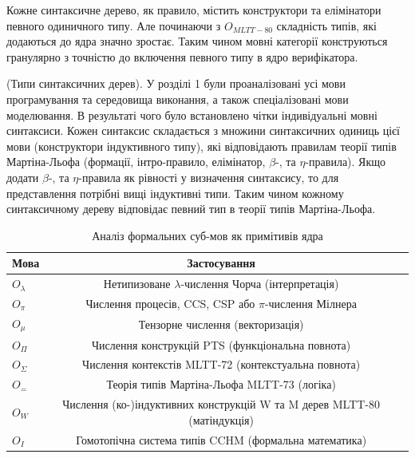 Кожне синтаксичне дерево, як правило, містить конструктори
та елімінатори певного одиничного типу. Але починаючи з $O_{MLTT-80}$
складність типів, які додаються до ядра значно зростає.
Таким чином мовні категорії конструються гранулярно з
точністю до включення певного типу в ядро верифікатора.

\begin{definition} (Типи синтаксичних дерев).
У розділі 1 були проаналізовані усі мови програмування та середовища виконання,
а також спеціалізовані мови моделювання. В результаті чого було встановлено
чітки індивідуальні мовні синтаксиси. Кожен синтаксис складається з
множини синтаксичних одиниць цієї мови (конструктори індуктивного типу),
які відповідають правилам теорії типів Мартіна-Льофа (формації, інтро-правило,
елімінатор, $\beta$-, та $\eta$-правила). Якщо додати $\beta$-, та $\eta$-правила
як рівності у визначення синтаксису, то для представлення потрібні вищі індуктивні типи.
Таким чином кожному синтаксичному дереву відповідає певний тип в теорії типів Мартіна-Льофа.
\begin{table}
  \caption{Аналіз формальних суб-мов як примітивів ядра}
 \begin{tabular}{lcc}
    \hline
       \textbf{Мова} & \textbf{Застосування} \\
    \hline
    \rowcolor{LightGray}
       $O_\lambda$                     & Нетипизоване $\lambda$-числення Чорча (інтерпретація) \\
    \rowcolor{LightGray}
       $O_\pi$                         & Числення процесів, CCS, CSP або $\pi$-числення Мілнера\\
    \rowcolor{LightGray}
       $O_\mu$                         & Тензорне числення (векторизація) \\
    \hline
    \rowcolor{LightGray}
       $O_\Pi$                         & Числення конструкцій PTS (функціональна повнота) \\
    \rowcolor{LightGray}
       $O_\Sigma$                      & Числення контекстів MLTT-72 (контекстуальна повнота) \\
    \rowcolor{LightGray}
       $O_=$                           & Теорія типів Мартіна-Льофа MLTT-73 (логіка) \\
    \rowcolor{LightGray}
       $O_W$                           & Числення (ко-)індуктивних конструкцій W та M дерев MLTT-80 (матіндукція) \\
    \rowcolor{LightGray}
       $O_{I}$                         & Гомотопічна система типів CCHM (формальна математика) \\

\end{tabular}
\end{table}
\end{definition}
